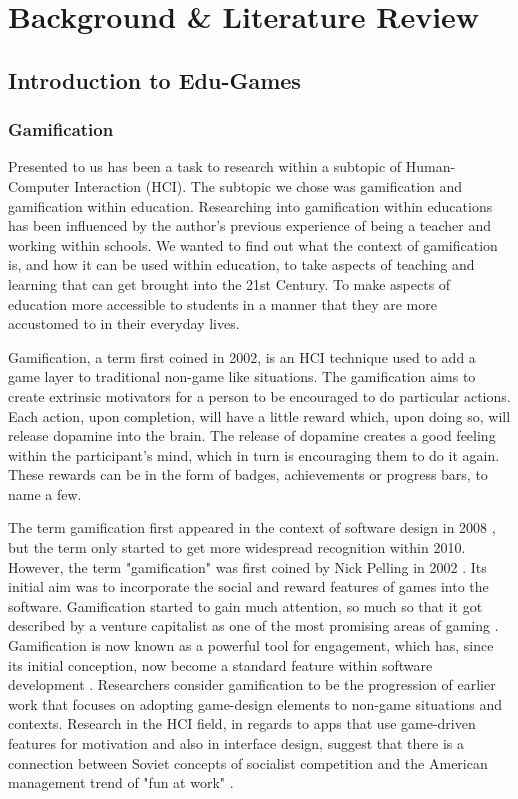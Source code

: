 \chapter{Background \& Literature Review}
	\label{chap:background_lit_review}
	
	
	\section{Introduction to Edu-Games}
	
	
	
	\subsection{Gamification}
	Presented to us has been a task to research within a subtopic of Human-Computer Interaction (HCI). The subtopic we chose was gamification and gamification within education. Researching into gamification within educations has been influenced by the author's previous experience of being a teacher and working within schools. We wanted to find out what the context of gamification is, and how it can be used within education, to take aspects of teaching and learning that can get brought into the 21st Century. To make aspects of education more accessible to students in a manner that they are more accustomed to in their everyday lives. 
	
	Gamification, a term first coined in 2002, is an HCI technique used to add a game layer to traditional non-game like situations. The gamification aims to create extrinsic motivators for a person to be encouraged to do particular actions. Each action, upon completion, will have a little reward which, upon doing so, will release dopamine into the brain. The release of dopamine creates a good feeling within the participant's mind, which in turn is encouraging them to do it again. These rewards can be in the form of badges, achievements or progress bars, to name a few.
	
	The term gamification first appeared in the context of software design in 2008 \cite{4}, but the term only started to get more widespread recognition within 2010. However, the term "gamification" was first coined by Nick Pelling in 2002 \cite{3e}. Its initial aim was to incorporate the social and reward features of games into the software. Gamification started to gain much attention, so much so that it got described by a venture capitalist as one of the most promising areas of gaming \cite{5}. Gamification is now known as a powerful tool for engagement, which has, since its initial conception, now become a standard feature within software development \cite{3e}. Researchers consider gamification to be the progression of earlier work that focuses on adopting game-design elements to non-game situations and contexts. Research in the HCI field, in regards to apps that use game-driven features for motivation and also in interface design, suggest that there is a connection between Soviet concepts of socialist competition and the American management trend of "fun at work" \cite{5}. 
	
